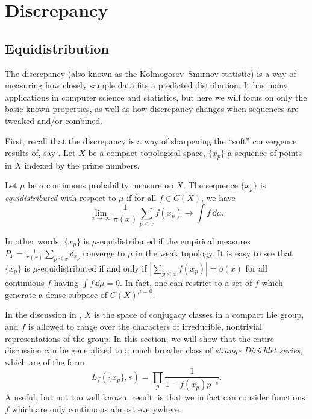 
\chapter{Discrepancy}





\section{Equidistribution}

The discrepancy (also known as the Kolmogorov--Smirnov statistic) is a way of 
measuring how closely sample data fits a predicted distribution. It has many 
applications in computer science and statistics, but here we will focus on only 
the basic known properties, as well as how discrepancy changes when sequences 
are tweaked and/or combined. 

First, recall that the discrepancy is a way of sharpening the ``soft'' 
convergence results of, say \cite[A.1]{serre-1989}. Let $X$ be a compact 
topological space, $\{x_p\}$ a sequence of points in $X$ indexed by the prime 
numbers. 

\begin{definition}
Let $\mu$ be a continuous probability measure on $X$. The sequence $\{x_p\}$ is 
\emph{equidistributed} with respect to $\mu$ if for all $f\in C(X)$, we have 
\[
	\lim_{x\to \infty} \frac{1}{\pi(x)} \sum_{p\leqslant x} f(x_p) \to \int f\, \dd \mu .
\]
\end{definition}

In other words, $\{x_p\}$ is $\mu$-equidistributed if the empirical measures 
$P_x = \frac{1}{\pi(x)} \sum_{p\leqslant x} \delta_{x_p}$ converge to $\mu$ in 
the weak topology. It is easy to see that $\{x_p\}$ is $\mu$-equidistributed if 
and only if $\left| \sum_{p\leqslant x} f(x_p)\right| = o(x)$ for all 
continuous $f$ having $\int f\, \dd\mu = 0$. In fact, one can restrict to a 
set of $f$ which generate a dense subpace of $C(X)^{\mu =0}$. 

In the discussion in \cite[A.1]{serre-1989}, $X$ is the space of conjugacy 
classes in a compact Lie group, and $f$ is allowed to range over the characters 
of irreducible, nontrivial representations of the group. In this section, we 
will show that the entire discussion can be generalized to a much broader class 
of \emph{strange Dirichlet series}, which are of the form 
\[
	L_f(\{x_p\},s) = \prod_p \frac{1}{1-f(x_p)p^{-s}} .
\]
A useful, but not too well known, result, is that we in fact can consider 
functions $f$ which are only continuous almost everywhere. 

